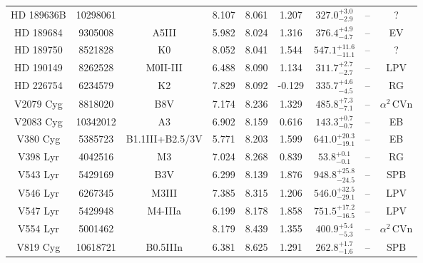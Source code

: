 \begin{table*}
\begin{tabular}{ccccccccc}
HD 189636B & 10298061 &  & 8.107 & 8.061 & 1.207 & $327.0^{+3.0}_{-2.9}$ & -- & ? \\
HD 189684 & 9305008 & A5III & 5.982 & 8.024 & 1.316 & $376.4^{+4.9}_{-4.7}$ & -- & EV \\
HD 189750 & 8521828 & K0 & 8.052 & 8.041 & 1.544 & $547.1^{+11.6}_{-11.1}$ & -- & ? \\
HD 190149 & 8262528 & M0II-III & 6.488 & 8.090 & 1.134 & $311.7^{+2.7}_{-2.7}$ & -- & LPV \\
HD 226754 & 6234579 & K2 & 7.829 & 8.092 & -0.129 & $335.7^{+4.6}_{-4.5}$ & -- & RG \\
V2079 Cyg & 8818020 & B8V & 7.174 & 8.236 & 1.329 & $485.8^{+7.3}_{-7.1}$ & -- & $\alpha^2\,\text{CVn}$ \\
V2083 Cyg & 10342012 & A3 & 6.902 & 8.159 & 0.616 & $143.3^{+0.7}_{-0.7}$ & -- & EB \\
V380 Cyg & 5385723 & B1.1III+B2.5/3V & 5.771 & 8.203 & 1.599 & $641.0^{+20.3}_{-19.1}$ & -- & EB \\
V398 Lyr & 4042516 & M3 & 7.024 & 8.268 & 0.839 & $53.8^{+0.1}_{-0.1}$ & -- & RG \\
V543 Lyr & 5429169 & B3V & 6.299 & 8.139 & 1.876 & $948.8^{+25.8}_{-24.5}$ & -- & SPB \\
V546 Lyr & 6267345 & M3III & 7.385 & 8.315 & 1.206 & $546.0^{+32.5}_{-29.1}$ & -- & LPV \\
V547 Lyr & 5429948 & M4-IIIa & 6.199 & 8.178 & 1.858 & $751.5^{+17.2}_{-16.5}$ & -- & LPV \\
V554 Lyr & 5001462 &  & 8.179 & 8.439 & 1.355 & $400.9^{+5.4}_{-5.3}$ & -- & $\alpha^2\,\text{CVn}$ \\
V819 Cyg & 10618721 & B0.5IIIn & 6.381 & 8.625 & 1.291 & $262.8^{+1.7}_{-1.6}$ & -- & SPB \\
\hline
\end{tabular}
\end{table*}
